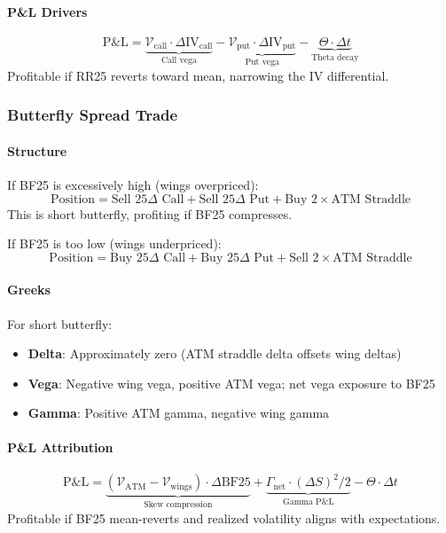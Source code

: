 \paragraph{P\&L Drivers}

\[
\text{P\&L} = \underbrace{\mathcal{V}_{\text{call}} \cdot \Delta \text{IV}_{\text{call}}}_{\text{Call vega}} - \underbrace{\mathcal{V}_{\text{put}} \cdot \Delta \text{IV}_{\text{put}}}_{\text{Put vega}} - \underbrace{\Theta \cdot \Delta t}_{\text{Theta decay}}
\]
Profitable if RR25 reverts toward mean, narrowing the IV differential.

\subsubsection{Butterfly Spread Trade}

\paragraph{Structure}

If BF25 is excessively high (wings overpriced):
\[
\text{Position} = \text{Sell 25}\Delta \text{ Call} + \text{Sell 25}\Delta \text{ Put} + \text{Buy 2} \times \text{ATM Straddle}
\]
This is short butterfly, profiting if BF25 compresses.

If BF25 is too low (wings underpriced):
\[
\text{Position} = \text{Buy 25}\Delta \text{ Call} + \text{Buy 25}\Delta \text{ Put} + \text{Sell 2} \times \text{ATM Straddle}
\]

\paragraph{Greeks}

For short butterfly:
\begin{itemize}
  \item \textbf{Delta}: Approximately zero (ATM straddle delta offsets wing deltas)
  \item \textbf{Vega}: Negative wing vega, positive ATM vega; net vega exposure to BF25
  \item \textbf{Gamma}: Positive ATM gamma, negative wing gamma
\end{itemize}

\paragraph{P\&L Attribution}

\[
\text{P\&L} = \underbrace{(\mathcal{V}_{\text{ATM}} - \mathcal{V}_{\text{wings}}) \cdot \Delta \text{BF25}}_{\text{Skew compression}} + \underbrace{\Gamma_{\text{net}} \cdot (\Delta S)^2 / 2}_{\text{Gamma P\&L}} - \Theta \cdot \Delta t
\]
Profitable if BF25 mean-reverts and realized volatility aligns with expectations.

